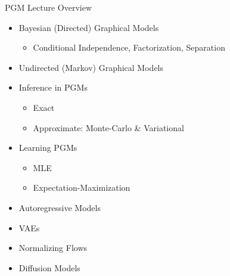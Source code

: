 \begin{frame}{PGM Lecture Overview}
\begin{minipage}{0.49\textwidth}
\begin{itemize}
    \item Bayesian (Directed) Graphical Models
    \begin{itemize}
    \item Conditional Independence, Factorization, Separation
    \end{itemize}
    \item Undirected (Markov) Graphical Models
    \item Inference in PGMs
    \begin{itemize}
        \item Exact
        \item Approximate: Monte-Carlo \& Variational
    \end{itemize}
    \item Learning PGMs
    \begin{itemize}
    \item MLE
    \item Expectation-Maximization
    \end{itemize}
\end{itemize}
\end{minipage}
\begin{minipage}{0.49\textwidth}
\begin{itemize}
    \item Autoregressive Models
    \item VAEs 
    \item Normalizing Flows
    \item Diffusion Models
\end{itemize}
\end{minipage}
\end{frame}
